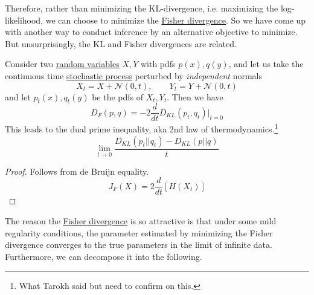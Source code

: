 \documentclass{article}
\begin{document}
    Therefore, rather than minimizing the KL-divergence, i.e. maximizing the log-likelihood, we can choose to minimize the \hyperref[def:fisher-divergence]{Fisher divergence}. So we have come up with another way to conduct inference by an alternative objective to minimize. But unsurprisingly, the KL and Fisher divergences are related.  

    \begin{theorem}
      \label{thm:relationship-between-fisher-and-kl-divergnces}
      Consider two \hyperref[prob-def:random-variable]{random variables} $X, Y$ with pdfs $p(x), q(y)$, and let us take the continuous time \hyperref[sp-def:stochastic-process]{stochastic process} perturbed by \textit{independent} normals 
      \begin{equation}
        X_t = X + \mathcal{N}(0, t), \qquad Y_t = Y + \mathcal{N}(0, t)
      \end{equation}
      and let $p_t (x), q_t (y)$ be the pdfs of $X_t, Y_t$. Then we have 
      \begin{equation}
        D_F (p, q) = -2 \frac{d}{dt} D_{KL} (p_t, q_t) \bigg|_{t = 0}
      \end{equation}
      This leads to the dual prime inequality, aka 2nd law of thermodynamics.\footnote{What Tarokh said but need to confirm on this.}
      \begin{equation}
        \lim_{t \rightarrow 0} \frac{D_{KL}(p_t || q_t) - D_{KL}(p||q)}{t}
      \end{equation}
    \end{theorem}
    \begin{proof}
      Follows from de Bruijn equality. 
      \begin{equation}
        J_F (X) = 2 \frac{d}{dt} [H(X_t)]
      \end{equation}
    \end{proof}

    The reason the \hyperref[def:fisher-divergence]{Fisher divergence} is so attractive is that under some mild regularity conditions, the parameter estimated by minimizing the Fisher divergence converges to the true parameters in the limit of infinite data. Furthermore, we can decompose it into the following. 
\end{document}
